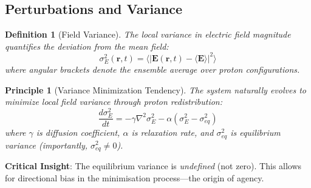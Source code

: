 \documentclass[12pt,a4paper]{article}
\newtheorem{definition}[theorem]{Definition}
\newtheorem{principle}[theorem]{Principle}
\begin{document}
\subsection{Perturbations and Variance}

\begin{definition}[Field Variance]
The local variance in electric field magnitude quantifies the deviation from the mean field:
\begin{equation}
\sigma^2_E(\mathbf{r}, t) = \langle |\mathbf{E}(\mathbf{r}, t) - \langle \mathbf{E} \rangle|^2 \rangle
\end{equation}
where angular brackets denote the ensemble average over proton configurations.
\end{definition}

\begin{principle}[Variance Minimization Tendency]
The system naturally evolves to minimize local field variance through proton redistribution:
\begin{equation}
\frac{d\sigma^2_E}{dt} = -\gamma \nabla^2 \sigma^2_E - \alpha (\sigma^2_E - \sigma^2_{eq})
\end{equation}
where $\gamma$ is diffusion coefficient, $\alpha$ is relaxation rate, and $\sigma^2_{eq}$ is equilibrium variance (importantly, $\sigma^2_{eq} \neq 0$).
\end{principle}

\textbf{Critical Insight}: The equilibrium variance is \textit{undefined} (not zero). This allows for directional bias in the minimisation process—the origin of agency.
\end{document}
